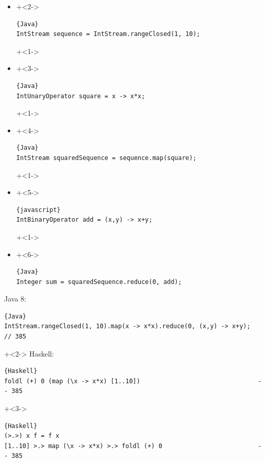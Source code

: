 \begin{frame}[fragile]{}
\begin{itemize}
\item {}
\onslide+<2->
\begin{lstlisting}{Java}
IntStream sequence = IntStream.rangeClosed(1, 10);
\end{lstlisting}
\onslide+<1->
\item {}
\onslide+<3->
\begin{lstlisting}{Java}
IntUnaryOperator square = x -> x*x;
\end{lstlisting}
\onslide+<1->
\item {}
\onslide+<4->
\begin{lstlisting}{Java}
IntStream squaredSequence = sequence.map(square);
\end{lstlisting}
\onslide+<1->
\item {}
\onslide+<5->
\begin{lstlisting}{javascript}
IntBinaryOperator add = (x,y) -> x+y;
\end{lstlisting}
\onslide+<1->
\item {}
\onslide+<6->
\begin{lstlisting}{Java}
Integer sum = squaredSequence.reduce(0, add);
\end{lstlisting}
\end{itemize}

\end{frame}

\begin{frame}[fragile]{}
Java 8:
\begin{lstlisting}{Java}
IntStream.rangeClosed(1, 10).map(x -> x*x).reduce(0, (x,y) -> x+y);  // 385
\end{lstlisting}

\onslide+<2->
Haskell:
\begin{lstlisting}{Haskell}
foldl (+) 0 (map (\x -> x*x) [1..10])                                -- 385
\end{lstlisting}
\onslide+<3->
\begin{lstlisting}{Haskell}
(>.>) x f = f x
[1..10] >.> map (\x -> x*x) >.> foldl (+) 0                          -- 385
\end{lstlisting}

\end{frame}

